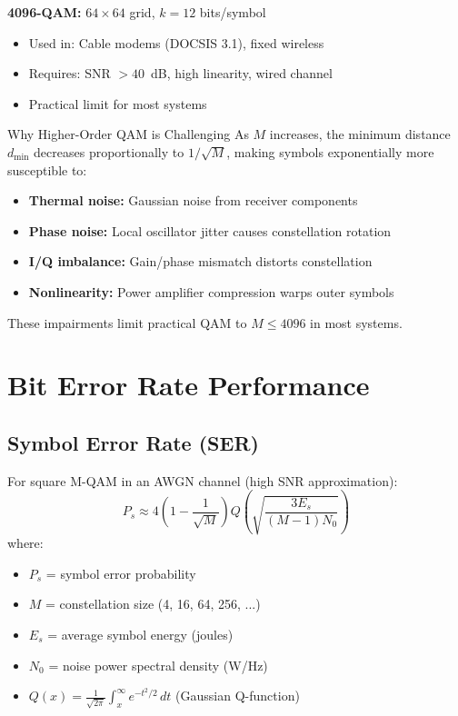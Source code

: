 \textbf{4096-QAM:} $64 \times 64$ grid, $k = 12$ bits/symbol
\begin{itemize}
\item Used in: Cable modems (DOCSIS 3.1), fixed wireless
\item Requires: SNR $> 40$~dB, high linearity, wired channel
\item Practical limit for most systems
\end{itemize}

\begin{calloutbox}{Why Higher-Order QAM is Challenging}
As $M$ increases, the minimum distance $d_{\min}$ decreases proportionally to $1/\sqrt{M}$, making symbols exponentially more susceptible to:
\begin{itemize}
\item \textbf{Thermal noise:} Gaussian noise from receiver components
\item \textbf{Phase noise:} Local oscillator jitter causes constellation rotation
\item \textbf{I/Q imbalance:} Gain/phase mismatch distorts constellation
\item \textbf{Nonlinearity:} Power amplifier compression warps outer symbols
\end{itemize}

These impairments limit practical QAM to $M \leq 4096$ in most systems.
\end{calloutbox}

\section{Bit Error Rate Performance}

\subsection{Symbol Error Rate (SER)}

For square M-QAM in an AWGN channel (high SNR approximation):
\begin{equation}
P_s \approx 4\left(1 - \frac{1}{\sqrt{M}}\right) Q\left(\sqrt{\frac{3E_s}{(M-1)N_0}}\right)
\label{eq:qam-ser}
\end{equation}
where:
\begin{itemize}
\item $P_s$ = symbol error probability
\item $M$ = constellation size (4, 16, 64, 256, ...)
\item $E_s$ = average symbol energy (joules)
\item $N_0$ = noise power spectral density (W/Hz)
\item $Q(x) = \frac{1}{\sqrt{2\pi}}\int_x^\infty e^{-t^2/2}\,dt$ (Gaussian Q-function)
\end{itemize}

